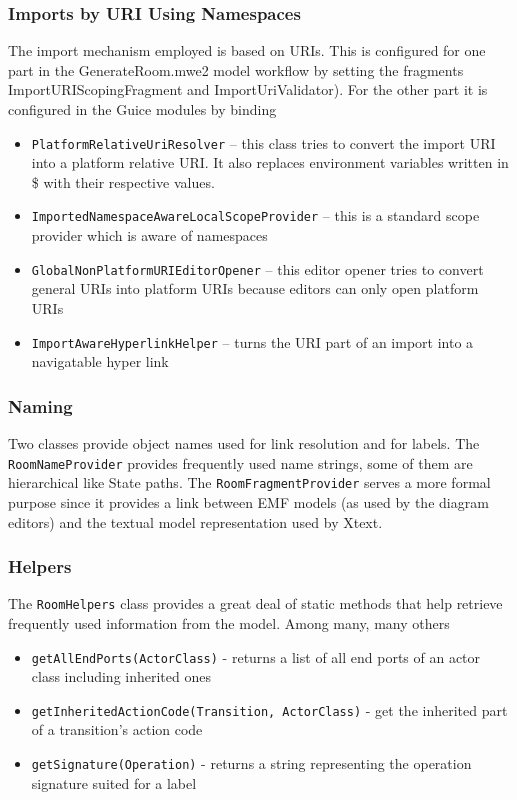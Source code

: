 \subsubsection*{Imports by URI Using Namespaces}

The import mechanism employed is based on URIs. This is configured for one part in the GenerateRoom.mwe2 
model workflow by setting the fragments ImportURIScopingFragment and ImportUriValidator). For the other 
part it is configured in the Guice modules by binding
\begin{itemize}
\item \texttt{PlatformRelativeUriResolver} -- this class tries to convert the import URI into a platform 
relative URI. It also replaces environment variables written in \${} with their respective values.
\item \texttt{ImportedNamespaceAwareLocalScopeProvider} -- this is a standard scope provider which is 
aware of namespaces
\item \texttt{GlobalNonPlatformURIEditorOpener} -- this editor opener tries to convert general URIs into 
platform URIs because editors can only open platform URIs
\item \texttt{ImportAwareHyperlinkHelper} -- turns the URI part of an import into a navigatable hyper link
\end{itemize}

\subsubsection*{Naming}

Two classes provide object names used for link resolution and for labels.
The \texttt{RoomNameProvider} provides frequently used name strings, some of them are hierarchical like 
State paths.
The \texttt{RoomFragmentProvider} serves a more formal purpose since it provides a link between EMF models 
(as used by the diagram editors) and the textual model representation used by Xtext.

\subsubsection*{Helpers}

The \texttt{RoomHelpers} class provides a great deal of static methods that help retrieve frequently used 
information from the model.
Among many, many others
\begin{itemize}
\item \texttt{getAllEndPorts(ActorClass)} - returns a list of all end ports of an actor class including 
inherited ones
\item \texttt{getInheritedActionCode(Transition, ActorClass)} - get the inherited part of a transition's 
action code
\item \texttt{getSignature(Operation)} - returns a string representing the operation signature suited for 
a label
\end{itemize}

